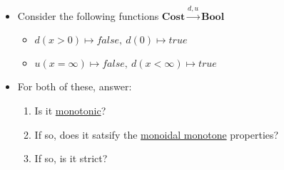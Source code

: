 \begin{itemize}
    \item Consider the following functions $\mathbf{Cost} \xrightarrow{d,u} \mathbf{Bool}$
          \begin{itemize}
            \item $d(x>0)\mapsto false,\ d(0)\mapsto true$
            \item $u(x=\infty)\mapsto false,\ d(x < \infty) \mapsto true$
          \end{itemize}
    \item For both of these, answer:
          \begin{enumerate}
            \item Is it \hyperref[D1.59]{monotonic}?
            \item If so, does it satsify the \hyperref[D2.41]{monoidal monotone} properties?
            \item If so, is it strict?
          \end{enumerate}
  \end{itemize}